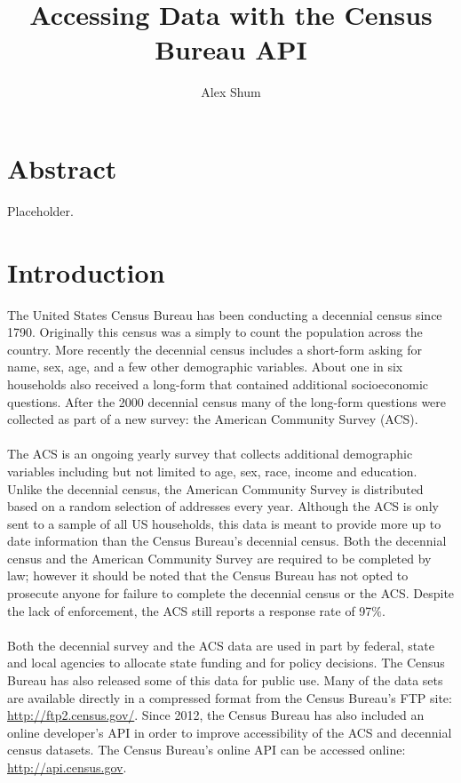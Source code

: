 \documentclass{article}\usepackage[]{graphicx}\usepackage[]{color}
\title{Accessing Data with the Census Bureau API}
\author{Alex Shum}
\begin{document}
\maketitle

\section{Abstract}
Placeholder.

\section{Introduction}
The United States Census Bureau has been conducting a decennial census since 1790.  Originally this census was a simply to count the population across the country.  More recently the decennial census includes a short-form asking for name, sex, age, and a few other demographic variables.  About one in six households also received a long-form that contained additional socioeconomic questions.  After the 2000 decennial census many of the long-form questions were collected as part of a new survey: the American Community Survey (ACS).  \\
\\
The ACS is an ongoing yearly survey that collects additional demographic variables including but not limited to age, sex, race, income and education.  Unlike the decennial census, the American Community Survey is distributed based on a random selection of addresses every year.  Although the ACS is only sent to a sample of all US households, this data is meant to provide more up to date information than the Census Bureau's decennial census.  Both the decennial census and the American Community Survey are required to be completed by law; however it should be noted that the Census Bureau has not opted to prosecute anyone for failure to complete the decennial census or the ACS.  Despite the lack of enforcement, the ACS still reports a response rate of 97$\%$.\\ %
\\
Both the decennial survey and the ACS data are used in part by federal, state and local agencies to allocate state funding and for policy decisions.  The Census Bureau has also released some of this data for public use.  Many of the data sets are available directly in a compressed format from the Census Bureau's FTP site: \url{http://ftp2.census.gov/}.  Since 2012, the Census Bureau has also included an online developer's API in order to improve accessibility of the ACS and decennial census datasets.  The Census Bureau's online API can be accessed online: \url{http://api.census.gov}.\\
\end{document}
